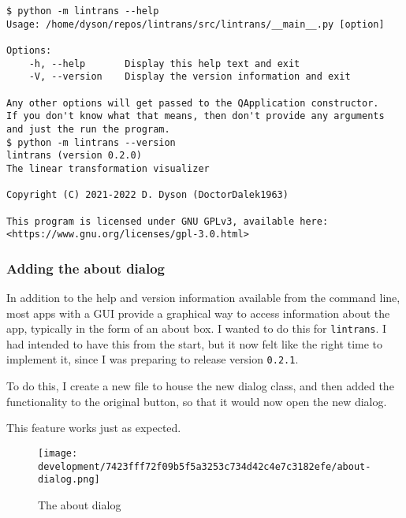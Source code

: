 \documentclass[../development.tex]{subfiles}
\begin{document}
\begin{verbatim}
$ python -m lintrans --help
Usage: /home/dyson/repos/lintrans/src/lintrans/__main__.py [option]

Options:
    -h, --help       Display this help text and exit
    -V, --version    Display the version information and exit

Any other options will get passed to the QApplication constructor.
If you don't know what that means, then don't provide any arguments and just the run the program.
$ python -m lintrans --version
lintrans (version 0.2.0)
The linear transformation visualizer

Copyright (C) 2021-2022 D. Dyson (DoctorDalek1963)

This program is licensed under GNU GPLv3, available here:
<https://www.gnu.org/licenses/gpl-3.0.html>
\end{verbatim}

\subsubsection{Adding the about dialog\label{development:preparing-for-v0.2.1:adding-the-about-dialog}}

In addition to the help and version information available from the command line, most apps with a GUI provide a graphical way to access information about the app, typically in the form of an about box. I wanted to do this for \texttt{lintrans}. I had intended to have this from the start, but it now felt like the right time to implement it, since I was preparing to release version \texttt{0.2.1}.

To do this, I create a new file to house the new dialog class, and then added the functionality to the original button, so that it would now open the new dialog.



This feature works just as expected.

\begin{figure}[H]
	\centering
	\texttt{[image: development/7423fff72f09b5f5a3253c734d42c4e7c3182efe/about-dialog.png]}
	\caption{The about dialog}
	\label{fig:development:7423fff72f09b5f5a3253c734d42c4e7c3182efe:about-dialog.png}
\end{figure}
\end{document}
